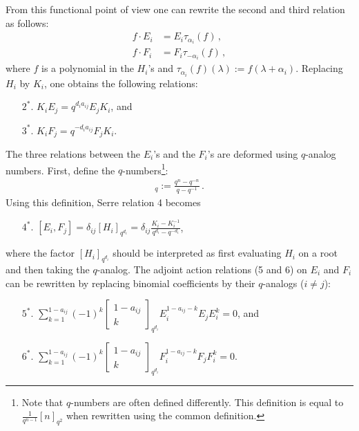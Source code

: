 \begin{construct}
        From this functional point of view one can rewrite the second and third relation as follows:
        \begin{align*}
            f\cdot E_i &= E_i\tau_{\alpha_i}(f)\,,\\
            f\cdot F_i &= F_i\tau_{-\alpha_i}(f)\,,
        \end{align*}
        where $f$ is a polynomial in the $H_i$'s and $\tau_{\alpha_i}(f)(\lambda) := f(\lambda+\alpha_i)$. Replacing $H_i$ by $K_i$, one obtains the following relations:
        \begin{enumerate}
            \item[$2^*.$] $K_iE_j = q^{d_ia_{ij}}E_jK_i$, and
            \item[$3^*.$] $K_iF_j = q^{-d_ia_{ij}}F_jK_i$.
        \end{enumerate}
        The three relations between the $E_i$'s and the $F_i$'s are deformed using $q$-analog numbers. First, define the $q$-numbers\footnote{Note that $q$-numbers are often defined differently. This definition is equal to $\frac{1}{q^{n-1}}[n]_{q^2}$ when rewritten using the common definition.}:
        \begin{gather}
            [n]_q := \frac{q^n - q^{-n}}{q - q^{-1}}\,.
        \end{gather}
        Using this definition, Serre relation 4 becomes
        \begin{enumerate}
            \item[$4^*.$] $[E_i,F_j] = \delta_{ij}[H_i]_{q^{d_i}} = \delta_{ij}\frac{K_i - K_i^{-1}}{q^{d_i} - q^{-d_i}}$,
        \end{enumerate}
        where the factor $[H_i]_{q^{d_i}}$ should be interpreted as first evaluating $H_i$ on a root and then taking the $q$-analog. The adjoint action relations (5 and 6) on $E_i$ and $F_i$ can be rewritten by replacing binomial coefficients by their $q$-analogs ($i\neq j$):
        \begin{enumerate}
            \item[$5^*.$] $\sum_{k=1}^{1-a_{ij}} (-1)^k\begin{bmatrix}1-a_{ij}\\k\end{bmatrix}_{q^{d_i}}E_i^{1-a_{ij}-k}E_jE_i^k = 0$, and
            \item[$6^*.$] $\sum_{k=1}^{1-a_{ij}} (-1)^k\begin{bmatrix}1-a_{ij}\\k\end{bmatrix}_{q^{d_i}}F_i^{1-a_{ij}-k}F_jF_i^k = 0$.
        \end{enumerate}
    \end{construct}


